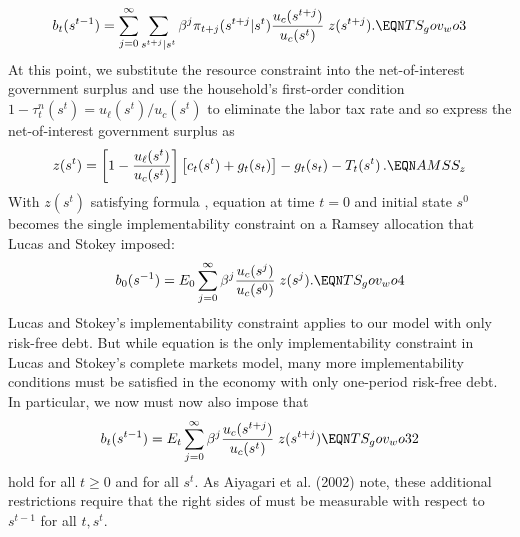 $$
 b_t(s^{t-1}) =  \sum_{j=0}^\infty \sum_{s^{t+j} | s^t} \beta^j  \pi_{t+j}(s^{t+j} | s^t)
               { u_c(s^{t+j}) \over u_c(s^{t}) } \;z(s^{t+j})   .   \EQN TS_gov_wo3
$$
At this point, we substitute
the resource constraint into the net-of-interest government surplus and
use the household's first-order condition $1-\tau^n_t(s^t)= u_{\ell}(s^t)
/u_c(s^t)$ to eliminate the labor tax rate and so express the net-of-interest
government surplus as
$$
z(s^t) = \left[1 - {u_{\ell}(s^t) \over u_c(s^t)}\right] \left[c_t(s^t)+g_t(s_t)\right]
-g_t(s_t) - T_t(s^t)\,.                                                   \EQN AMSS_z
$$
With $z(s^t)$ satisfying formula , equation  at time $t=0$ and initial state $s^0$
becomes the single  implementability constraint on a Ramsey allocation  that  Lucas and Stokey imposed:
$$
 b_0(s^{-1}) = E_{0} \sum_{j=0}^\infty \beta^j
               { u_c(s^{j}) \over u_c(s^{0}) } \;z(s^{j}).    \EQN TS_gov_wo4
$$%
Lucas and Stokey's implementability constraint applies to our model with only risk-free debt.
But while equation  is the only implementability
constraint  in Lucas and Stokey's complete markets model,
many more implementability conditions must be satisfied in the
economy with only one-period risk-free debt. In particular,
we now must now also impose  that
$$
b_t(s^{t-1}) = E_{t} \sum_{j=0}^\infty \beta^j
               { u_c(s^{t+j}) \over u_c(s^{t}) } \;z(s^{t+j}) \EQN TS_gov_wo32  $$
hold for all $t \geq 0$ and for all $s^t$.
As Aiyagari et al. (2002) note, these additional restrictions require that the right
sides of  must be measurable with  respect to $s^{t-1}$ for all $t, s^{t}$.
%
%
%

